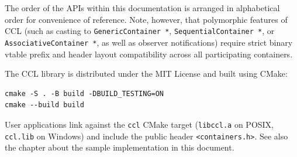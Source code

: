 The order of the APIs within this documentation is arranged in alphabetical order for convenience of reference. Note, however, that polymorphic features of CCL (such as casting to \texttt{GenericContainer *}, \texttt{SequentialContainer *}, or \texttt{AssociativeContainer *}, as well as observer notifications) require strict binary vtable prefix and header layout compatibility across all participating containers.

The CCL library is distributed under the MIT License and built using CMake:
\begin{verbatim}
cmake -S . -B build -DBUILD_TESTING=ON
cmake --build build
\end{verbatim}
User applications link against the \texttt{ccl} CMake target (\texttt{libccl.a} on POSIX, \texttt{ccl.lib} on Windows) and include the public header \texttt{<containers.h>}. See also the chapter about the sample implementation in this document.
